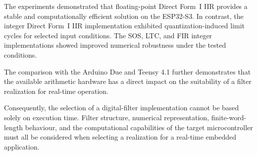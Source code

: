 The experiments demonstrated that floating-point Direct Form~I IIR provides a
stable and computationally efficient solution on the ESP32-S3. In contrast, the
integer Direct Form~I IIR implementation exhibited quantization-induced limit
cycles for selected input conditions. The SOS, LTC, and FIR integer
implementations showed improved numerical robustness under the tested
conditions.

The comparison with the Arduino Due and Teensy 4.1 further demonstrates that
the available arithmetic hardware has a direct impact on the suitability of a
filter realization for real-time operation.

Consequently, the selection of a digital-filter implementation cannot be based
solely on execution time. Filter structure, numerical representation,
finite-word-length behaviour, and the computational capabilities of the target
microcontroller must all be considered when selecting a realization for a
real-time embedded application.